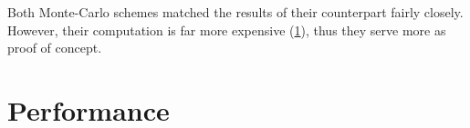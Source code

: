 \documentclass[a4paper,oneside]{csthesis}
\begin{document}
Both Monte-Carlo schemes matched the results of their counterpart fairly closely. However, their computation is far more expensive (\cref{sec:performance}), thus they serve more as proof of concept.
\begin{figure}[ht]
    \caption{}\label{fig:eval-monte-carlo}
\end{figure}


\newpage
\section{Performance}
\label{sec:performance}
\end{document}

